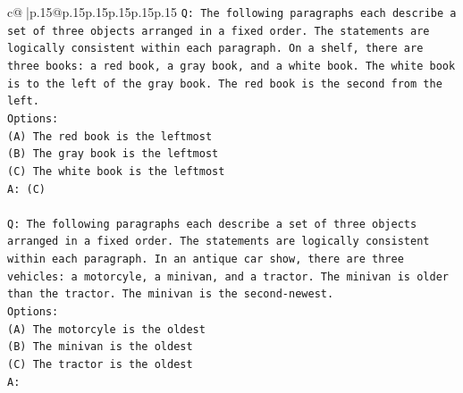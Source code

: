 \documentclass{article}
\begin{document}
{\begin{supertabular}{c@{$\;$}|p{.15\linewidth}@{}p{.15\linewidth}p{.15\linewidth}p{.15\linewidth}p{.15\linewidth}p{.15\linewidth}}
{{{\texttt{Q: The following paragraphs each describe a set of three objects arranged in a fixed order. The statements are logically consistent within each paragraph. On a shelf, there are three books: a red book, a gray book, and a white book. The white book is to the left of the gray book. The red book is the second from the left.} \\
\texttt{Options:} \\
\texttt{(A) The red book is the leftmost} \\
\texttt{(B) The gray book is the leftmost} \\
\texttt{(C) The white book is the leftmost} \\
\texttt{A: (C)} \\
\\ 
\texttt{Q: The following paragraphs each describe a set of three objects arranged in a fixed order. The statements are logically consistent within each paragraph. In an antique car show, there are three vehicles: a motorcyle, a minivan, and a tractor. The minivan is older than the tractor. The minivan is the second{-}newest.} \\
\texttt{Options:} \\
\texttt{(A) The motorcyle is the oldest} \\
\texttt{(B) The minivan is the oldest} \\
\texttt{(C) The tractor is the oldest} \\
\texttt{A:} \\
            }
        }
    }
     \\ \\


\end{supertabular}}
\end{document}
